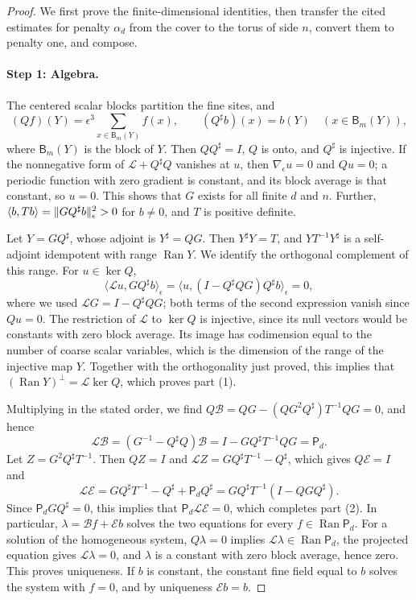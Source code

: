 \begin{proof}
We first prove the finite-dimensional identities, then transfer the cited estimates for penalty $\alpha_d$ from the cover to the torus of side $n$, convert them to penalty one, and compose.

\paragraph{Step 1: Algebra.}
The centered scalar blocks partition the fine sites, and
\[
 (Qf)(Y)=\epsilon^3\sum_{x\in\mathsf B_m(Y)}f(x),\qquad(Q^\sharp b)(x)=b(Y)\quad(x\in\mathsf B_m(Y)),
\]
where $\mathsf B_m(Y)$ is the block of $Y$. Then $QQ^\sharp=I$, $Q$ is onto, and $Q^\sharp$ is injective. If the nonnegative form of $\mathscr L+Q^\sharp Q$ vanishes at $u$, then $\nabla_\epsilon u=0$ and $Qu=0$; a periodic function with zero gradient is constant, and its block average is that constant, so $u=0$. This shows that $G$ exists for all finite $d$ and $n$. Further, $\langle b,Tb\rangle=\lVert GQ^\sharp b\rVert_\epsilon^2>0$ for $b\ne0$, and $T$ is positive definite.

Let $Y=GQ^\sharp$, whose adjoint is $Y^\sharp=QG$. Then $Y^\sharp Y=T$, and $YT^{-1}Y^\sharp$ is a self-adjoint idempotent with range $\operatorname{Ran}Y$. We identify the orthogonal complement of this range. For $u\in\ker Q$,
\[
 \langle\mathscr Lu,GQ^\sharp b\rangle_\epsilon=\langle u,(I-Q^\sharp QG)Q^\sharp b\rangle_\epsilon=0,
\]
where we used $\mathscr LG=I-Q^\sharp QG$; both terms of the second expression vanish since $Qu=0$. The restriction of $\mathscr L$ to $\ker Q$ is injective, since its null vectors would be constants with zero block average. Its image has codimension equal to the number of coarse scalar variables, which is the dimension of the range of the injective map $Y$. Together with the orthogonality just proved, this implies that $(\operatorname{Ran}Y)^\perp=\mathscr L\ker Q$, which proves part (1).

Multiplying in the stated order, we find $Q\mathscr B=QG-(QG^2Q^\sharp)T^{-1}QG=0$, and hence
\begin{equation}\label{ch06:eq:LB-identity}
 \mathscr L\mathscr B=(G^{-1}-Q^\sharp Q)\mathscr B=I-GQ^\sharp T^{-1}QG=\mathsf P_d.
\end{equation}
Let $Z=G^2Q^\sharp T^{-1}$. Then $QZ=I$ and $\mathscr LZ=GQ^\sharp T^{-1}-Q^\sharp$, which gives $Q\mathscr E=I$ and
\[
 \mathscr L\mathscr E=GQ^\sharp T^{-1}-Q^\sharp+\mathsf P_dQ^\sharp=GQ^\sharp T^{-1}(I-QGQ^\sharp).
\]
Since $\mathsf P_dGQ^\sharp=0$, this implies that $\mathsf P_d\mathscr L\mathscr E=0$, which completes part (2). In particular, $\lambda=\mathscr Bf+\mathscr Eb$ solves the two equations for every $f\in\operatorname{Ran}\mathsf P_d$. For a solution of the homogeneous system, $Q\lambda=0$ implies $\mathscr L\lambda\in\operatorname{Ran}\mathsf P_d$, the projected equation gives $\mathscr L\lambda=0$, and $\lambda$ is a constant with zero block average, hence zero. This proves uniqueness. If $b$ is constant, the constant fine field equal to $b$ solves the system with $f=0$, and by uniqueness $\mathscr Eb=b$.


\end{proof}
